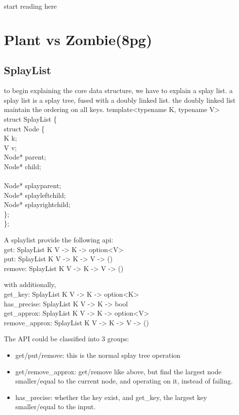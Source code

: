 \pavel start reading here
\section{Plant vs Zombie(8pg)}
\subsection{SplayList} 
to begin explaining the core data structure, we have to explain a splay list.
a splay list is a splay tree, fused with a doubly linked list.
the doubly linked list maintain the ordering on all keys.
template<typename K, typename V> \\
struct SplayList \{ \\
	struct Node \{ \\
		K k; \\
		V v; \\
		Node* parent; \\
		Node* child; \\
		\\		
		Node* splayparent; \\
		Node* splayleftchild; \\
		Node* splayrightchild; \\
	\}; \\
\};


A splaylist provide the following api: \\
get: SplayList K V -> K -> option<V> \\
put: SplayList K V -> K -> V -> () \\
remove: SplayList K V -> K -> V -> ()

with additionally, \\
get\_key: SplayList K V -> K -> option<K> \\
has\_precise: SplayList K V -> K -> bool \\
get\_approx: SplayList K V -> K -> option<V> \\
remove\_approx: SplayList K V -> K -> V -> ()

The API could be classified into 3 groups:
\begin{itemize}
\item get/put/remove: this is the normal splay tree operation
\item get/remove\_approx: get/remove like above, but find the largest node smaller/equal to the current node, and operating on it, instead of failing.
\item has\_precise: whether the key exist, and get\_key, the largest key smaller/equal to the input.
\end{itemize}


